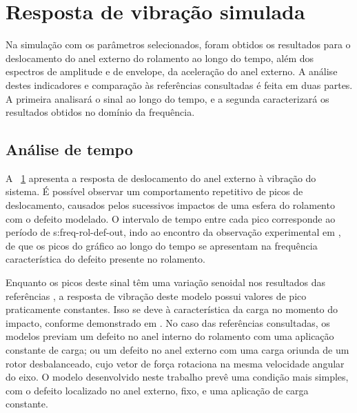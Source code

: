 \documentclass[12pt,oneside,english,brazil,lmodern,siglas,simbolos,cite=num]{ucsmonograph}
\begin{document}
	\section{Resposta de vibração simulada}
	Na simulação com os parâmetros selecionados, foram obtidos os resultados para o deslocamento do anel externo do rolamento ao longo do tempo, além dos espectros de amplitude e de envelope, da aceleração do anel externo.
	A análise destes indicadores e comparação às referências consultadas é feita em duas partes.
	A primeira analisará o sinal ao longo do tempo, e a segunda caracterizará os resultados obtidos no domínio da frequência.
	
	\subsection{Análise de tempo} \label{sec:res:analise-tempo}
	A \figurename\ \ref{fig:modelo-ext-tempo} apresenta a resposta de deslocamento do anel externo à vibração do sistema.
	É possível observar um comportamento repetitivo de picos de deslocamento, causados pelos sucessivos impactos de uma esfera do rolamento com o defeito modelado.
	O intervalo de tempo entre cada pico corresponde ao período de \gls{s:freq-rol-def-out}, indo ao encontro da observação experimental em \cite{cong:2013}, de que os picos do gráfico ao longo do tempo se apresentam na frequência característica do defeito presente no rolamento.
	
	\begin{figure}[b]
		\label{fig:modelo-ext-tempo}
	\end{figure}
	
	Enquanto os picos deste sinal têm uma variação senoidal nos resultados das referências \cite{mcfadden:1984,sassi:2007,cong:2013,patil:2010}, a resposta de vibração deste modelo possui valores de pico praticamente constantes.
	Isso se deve à característica da carga no momento do impacto, conforme demonstrado em \cite{mcfadden:1984,cong:2013}.
	No caso das referências consultadas, os modelos previam um defeito no anel interno do rolamento com uma aplicação constante de carga; ou um defeito no anel externo com uma carga oriunda de um rotor desbalanceado, cujo vetor de força rotaciona na mesma velocidade angular do eixo.
	O modelo desenvolvido neste trabalho prevê uma condição mais simples, com o defeito localizado no anel externo, fixo, e uma aplicação de carga constante.
	
\end{document}
